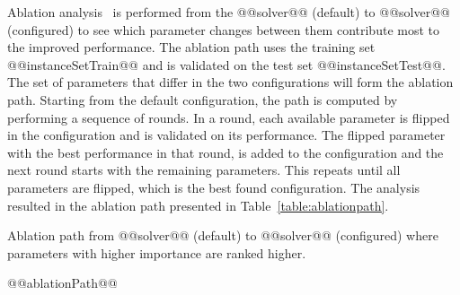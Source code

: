 \documentclass[british]{article}
\begin{document}
    Ablation analysis~\cite{FawcettHoos16} is performed from the @@solver@@ (default) to @@solver@@ (configured) to see which parameter changes between them contribute most to the improved performance.
    The ablation path uses the training set @@instanceSetTrain@@ and is validated on the test set @@instanceSetTest@@.
    The set of parameters that differ in the two configurations will form the ablation path.
    Starting from the default configuration, the path is computed by performing a sequence of rounds.
    In a round, each available parameter is flipped in the configuration and is validated on its performance.
    The flipped parameter with the best performance in that round, is added to the configuration and the next round starts with the remaining parameters.
    This repeats until all parameters are flipped, which is the best found configuration.
    The analysis resulted in the ablation path presented in Table~\ref{table:ablationpath}.


    \begin{table}[htbp]
        \caption{Ablation path from @@solver@@ (default) to @@solver@@ (configured) where parameters with higher importance are ranked higher.}
        \label{table:ablationpath}
        \begin{center}
        \footnotesize
            @@ablationPath@@
        \end{center}
    \end{table}

\fi %



\end{document}

